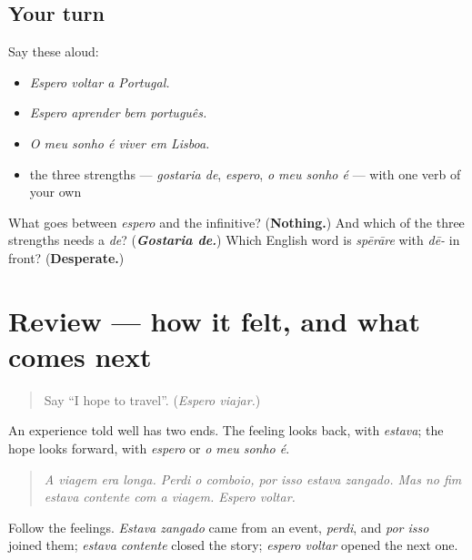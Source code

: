 \subsection*{Your turn}
Say these aloud:

\begin{itemize}
\raggedright
  \item \emph{Espero voltar a Portugal.}
  \item \emph{Espero aprender bem português.}
  \item \emph{O meu sonho é viver em Lisboa.}
  \item the three strengths — \emph{gostaria de}, \emph{espero}, \emph{o meu sonho é} — with one verb of your own
\end{itemize}

\begin{tcolorbox}[breakable,colback=teal!4,colframe=teal!35!black,title={Before you move on}]
What goes between \emph{espero} and the infinitive? (\textbf{Nothing.}) And which of the three strengths needs a \emph{de}? (\emph{\textbf{Gostaria de.}}) Which English word is \emph{spērāre} with \emph{dē-} in front? (\textbf{Desperate.})
\end{tcolorbox}
\section[(review)]{Review — how it felt, and what comes next}

\label{lesson:PT-C265-revisao-sentimentos}



\begin{quote}
Say \textquotedblleft{}I hope to travel\textquotedblright{}. (\emph{Espero viajar.})
\end{quote}

\begin{grammarlens}[title={What you've built}]
An experience told well has two ends. The feeling looks back, with \emph{estava}; the hope looks forward, with \emph{espero} or \emph{o meu sonho é}.

\begin{quote}
\emph{A viagem era longa. Perdi o comboio, por isso estava zangado. Mas no fim estava contente com a viagem. Espero voltar.}
\end{quote}

Follow the feelings. \emph{Estava zangado} came from an event, \emph{perdi}, and \emph{por isso} joined them; \emph{estava contente} closed the story; \emph{espero voltar} opened the next one.
\end{grammarlens}

